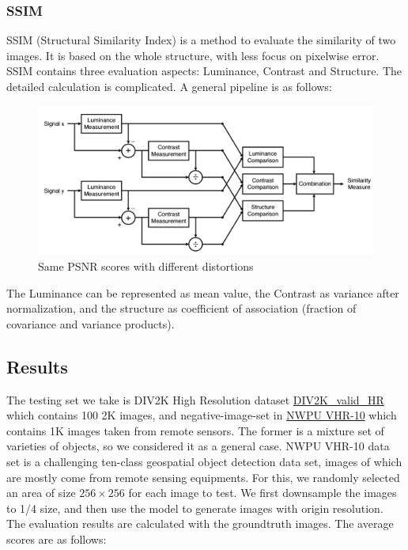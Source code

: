 \documentclass{article}
\begin{document}
    \subsubsection{SSIM}   
      SSIM (Structural Similarity Index) is a method to evaluate the similarity of two images.
      It is based on the whole structure, with less focus on pixelwise error. 
      SSIM contains three evaluation aspects: Luminance, Contrast and Structure.
      The detailed calculation is complicated. A general pipeline is as follows:
      \begin{figure}[H]
          \centering
          \includegraphics[scale = 0.2]{images/SSIM.png}
          \caption{Same PSNR scores with different distortions}
      \end{figure}
      The Luminance can be represented as mean value, the Contrast as variance after normalization, 
      and the structure as coefficient of association (fraction of covariance and variance products).
  

  \subsection{Results}
  The testing set we take is DIV2K High Resolution dataset \href{https://data.vision.ee.ethz.ch/cvl/DIV2K}{DIV2K\_valid\_HR} 
  which contains 100 2K images, and negative-image-set in \href{https://hyper.ai/datasets/5422}{NWPU VHR-10} which contains 1K images taken from remote sensors.
  The former is a mixture set of varieties of objects, so we considered it as a general case.
  NWPU VHR-10 data set is a challenging ten-class geospatial object detection data set, images of which are mostly come from remote sensing equipments. 
  For this, we randomly selected an area of size $256\times 256$ for each image to test.
  We first downsample the images to 1/4 size, and then use the model to generate images with origin resolution.
  The evaluation results are calculated with the groundtruth images.
  The average scores are as follows:
\end{document}
